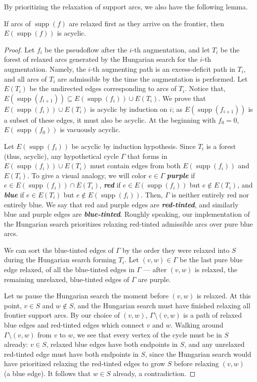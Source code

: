 \documentclass[a4paper,UKenglish]{socg-lipics-v2018}
\def\etal{\emph{et~al.}}
\def\etal{\textit{et~al.}}
\def\supp{\operatorname{supp}}
\theoremstyle{plain}
\numberwithin{figure}{section}
\def\EMPH#1{\textbf{\emph{\boldmath #1}}}
\begin{document}
\begin{toappendix}

By prioritizing the relaxation of support arcs, we also have the following
lemma.

\begin{lemmarep}[(Agarwal~\etal~\cite{AFPVX17})]
\label{lemma:orlin_acyclic}
If arcs of $\supp(f)$ are relaxed first as they arrive on the frontier, then
$E(\supp(f))$ is acyclic.
\end{lemmarep}

\begin{proof}
Let $f_i$ be the pseudoflow after the $i$-th augmentation, and let $T_i$ be the
forest of relaxed arcs generated by the Hungarian search for the $i$-th
augmentation.
Namely, the $i$-th augmenting path is an excess-deficit path in $T_i$, and all
arcs of $T_i$ are admissible by the time the augmentation is performed.
Let $E(T_i)$ be the undirected edges corresponding to arcs of $T_i$.
Notice that, $E(\supp(f_{i+1})) \subseteq E(\supp(f_i)) \cup E(T_i)$.
We prove that $E(\supp(f_i)) \cup E(T_i)$ is acyclic by induction on $i$;
as $E(\supp(f_{i+1}))$ is a subset of these edges, it must also be acyclic.
At the beginning with $f_0 = 0$, $E(\supp(f_0))$ is vacuously acyclic.

Let $E(\supp(f_i))$ be acyclic by induction hypothesis.
Since $T_i$ is a forest (thus, acyclic), any hypothetical cycle $\Gamma$ that
forms in $E(\supp(f_i)) \cup E(T_i)$ must contain edges from both
$E(\supp(f_i))$ and $E(T_i)$.
To give a visual analogy, we will color $e \in \Gamma$
\EMPH{purple} if $e \in E(\supp(f_i)) \cap E(T_i)$,
\EMPH{red} if $e \in E(\supp(f_i))$ but $e \not\in E(T_i)$,
and \EMPH{blue} if $e \in E(T_i)$ but $e \not\in E(\supp(f_i))$.
Then, $\Gamma$ is neither entirely red nor entirely blue.
We say that red and purple edges are \EMPH{red-tinted}, and similarly blue and
purple edges are \EMPH{blue-tinted}.
Roughly speaking, our implementation of the Hungarian search prioritizes
relaxing red-tinted admissible arcs over pure blue arcs. %

We can sort the blue-tinted edges of $\Gamma$ by the order they were relaxed
into $S$ during the Hungarian search forming $T_i$.
Let $(v, w) \in \Gamma$ be the last pure blue edge relaxed, of all the
blue-tinted edges in $\Gamma$ --- after $(v, w)$ is relaxed, the remaining
unrelaxed, blue-tinted edges of $\Gamma$ are purple.

Let us pause the Hungarian search the moment before $(v, w)$ is relaxed.
At this point, $v \in S$ and $w \not\in S$, and the Hungarian search must have
finished relaxing all frontier support arcs.
By our choice of $(v, w)$, $\Gamma \setminus (v, w)$ is a path of relaxed blue
edges and red-tinted edges which connect $v$ and $w$.
Walking around $\Gamma \setminus (v, w)$ from $v$ to $w$, we see that every
vertex of the cycle must be in $S$ already: $v \in S$, relaxed blue edges have
both endpoints in $S$, and any unrelaxed red-tinted edge must have both
endpoints in $S$, since the Hungarian search would have prioritized relaxing
the red-tinted edges to grow $S$ before relaxing $(v, w)$ (a blue edge).
It follows that $w \in S$ already, a contradiction.


\end{proof}
\end{toappendix}
\end{document}
